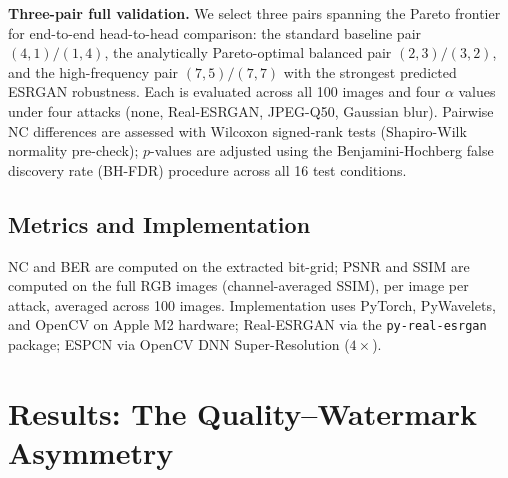 \documentclass[conference]{IEEEtran}
\begin{document}
\textbf{Three-pair full validation.} We select three pairs spanning the
Pareto frontier for end-to-end head-to-head comparison: the standard
baseline pair $(4,1)/(1,4)$, the analytically Pareto-optimal balanced
pair $(2,3)/(3,2)$, and the high-frequency pair $(7,5)/(7,7)$ with the
strongest predicted ESRGAN robustness. Each is evaluated across all 100
images and four $\alpha$ values under four attacks (none, Real-ESRGAN,
JPEG-Q50, Gaussian blur). Pairwise NC differences are assessed with
Wilcoxon signed-rank tests (Shapiro-Wilk normality pre-check); $p$-values
are adjusted using the Benjamini-Hochberg false discovery rate (BH-FDR)
procedure across all 16 test conditions.

\subsection{Metrics and Implementation}
NC and BER are computed on the extracted bit-grid; PSNR and SSIM
\cite{ssim2004} are computed on the full RGB images (channel-averaged
SSIM), per image per attack, averaged across 100 images. Implementation uses
PyTorch, PyWavelets, and OpenCV on Apple M2 hardware; Real-ESRGAN via
the \texttt{py-real-esrgan} package; ESPCN via OpenCV DNN
Super-Resolution ($4\times$).

\section{Results: The Quality--Watermark Asymmetry}
\label{sec:results}
\end{document}
